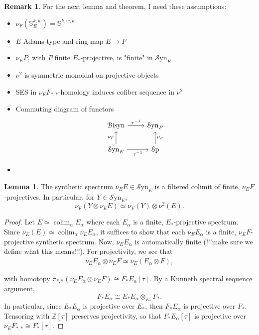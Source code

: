 \documentclass[10pt]{amsart}
\theoremstyle{definition}
\numberwithin{figure}{section}
\numberwithin{equation}{section}
\newtheorem{lem}[figure]{Lemma}
\newtheorem{rem}[figure]{Remark}
\theoremstyle{cited}
\newcommand{\colim}{\operatorname{colim}}
\newcommand{\Sp}{{\mathcal{S}\mathrm{p}}}
\newcommand{\Syn}{\mathcal{S}\mathrm{yn}}
\newcommand{\Bisyn}{\mathcal{B}\mathrm{isyn}}
\begin{document}
\begin{rem}
For the next lemma and theorem, I need these assumptions:
\begin{itemize}
\item $\nu_F(\mathbb{S}^{k,w}_E) = \mathbb{S}^{k,w,k}$
\item $E$ Adams-type and ring map $E\to F$
\item $\nu_EP$, with $P$ finite $E_*$-projective, is "finite" in $\Syn_E$
\item $\nu^2$ is symmetric monoidal on projective objects
\item SES in $\nu_EF_{*,*}$-homology induces cofiber sequence in $\nu^2$
\item Commuting diagram of functors
\begin{equation*}
\begin{tikzcd}
\Bisyn \arrow[r,"\tau^{-1}"]           & \Syn_F        \\
\Syn_E \arrow[u,"\nu_F"] \arrow[r,"\tau^{-1}"'] & \Sp \arrow[u,"\nu_F"']
\end{tikzcd}
\end{equation*}
\item 
\end{itemize}
\end{rem}

\begin{lem}
\label{nuFsymmonlemma}
The synthetic spectrum $\nu_EE\in\Syn_E$ is a filtered colimit of finite, $\nu_EF$-projectives. In particular, for $Y\in\Syn_E$, $$\nu_F(Y\otimes\nu_EE)\simeq\nu_F(Y)\otimes\nu^2(E).$$ 
\end{lem}

\begin{proof}
Let $E\simeq \colim _{\alpha} E_\alpha$ where each $E_\alpha$ is a finite, $E_*$-projective spectrum. Since $\nu_E(E)\simeq\colim_\alpha \nu_EE_\alpha$, it suffices to show that each $\nu_EE_\alpha$ is a finite, $\nu_EF$-projective synthetic spectrum. Now, $\nu_EE_\alpha$ is automatically finite (!!!make sure we define what this means!!!). For projectivity, we see that
$$
\begin{aligned}
\nu_EE_\alpha\otimes\nu_EF\simeq\nu_E(E_\alpha\otimes F),
\end{aligned}
$$

with homotopy $\pi_{*,*}(\nu_EE_\alpha\otimes\nu_EF)\cong F_*E_\alpha[\tau]$. By a Kunneth spectral sequence argument,
$$
F_*E_\alpha\cong E_*E_\alpha\otimes_{E_*}F_*.
$$
In particular, since $E_*E_\alpha$ is projective over $E_*$, then $F_*E_\alpha$ is projective over $F_*$. Tensoring with $\mathbb{Z}[\tau]$ preserves projectivity, so that
$F_*E_\alpha[\tau]$ is projective over $\nu_EF_{*,*}\cong F_*[\tau]$.  
\end{proof}
\end{document}
